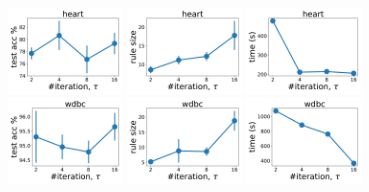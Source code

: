 \begin{figure}[t]
	\centering
	
	\subfloat
	{\includegraphics[width=0.27\textwidth]{figures/interpretability/relaxed-cnf/heart_test_accuracy_vary_iteration.pdf}}
	\subfloat
	{\includegraphics[width=0.27\textwidth]{figures/interpretability/relaxed-cnf/heart_rule_size_vary_iteration.pdf}}
	\subfloat
	{\includegraphics[width=0.27\textwidth]{figures/interpretability/relaxed-cnf/heart_time_vary_iteration.pdf}} 
	\\
	
	\subfloat
	{\includegraphics[width=0.27\textwidth]{figures/interpretability/relaxed-cnf/wdbc_test_accuracy_vary_iteration.pdf}}
	\subfloat
	{\includegraphics[width=0.27\textwidth]{figures/interpretability/relaxed-cnf/wdbc_rule_size_vary_iteration.pdf}}
	\subfloat
	{\includegraphics[width=0.27\textwidth]{figures/interpretability/relaxed-cnf/wdbc_time_vary_iteration.pdf}} 
	\\
	

\end{figure}
